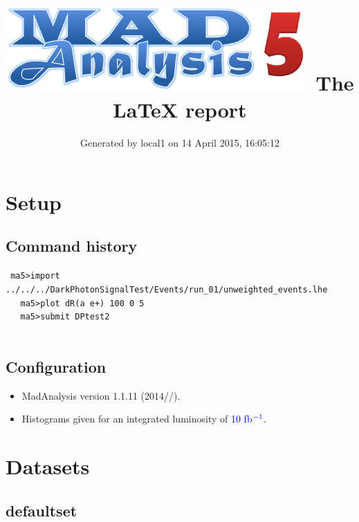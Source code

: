 \documentclass[a4paper, 11pt]{article}
\title{{\includegraphics[scale=.4]{logo.png}}\ The LaTeX report}
\author{Generated by local1 on 14 April 2015, 16:05:12}
\begin{document}
\maketitle
\flushbottom

\newpage
\section{ Setup}

\subsection{ Command history}

\texttt{ ma5>import ../\-../\-../\-DarkPhotonSignalTest/\-Events/\-run\_01/\-unweighted\_events.lhe\\
}
\texttt{ }\texttt{ }\texttt{ ma5>plot dR(a e+) 100 0 5\\
}
\texttt{ }\texttt{ }\texttt{ ma5>submit DPtest2\\
}
\texttt{ }\texttt{ }\subsection{ Configuration}

\begin{itemize}
  \item MadAnalysis version 1.1.11 (2014//).
   \item Histograms given for an integrated luminosity of \textcolor{blue}{10}\textcolor{blue}{ fb}$^{\textcolor{blue}{-1}}$\textcolor{blue}{.}
\textcolor{blue}{}
\end{itemize}
\newpage
\section{ Datasets}

\subsection{ defaultset}
\end{document}
